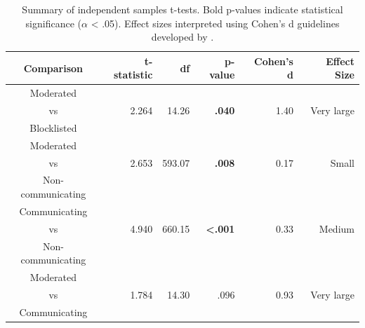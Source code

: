 \begin{table}[tb]
    \centering
    \begin{tabular}{@{}crrrrr@{}}
    \hline
    Comparison & t-statistic & df & p-value & Cohen's d & Effect Size \\
    \hline
    Moderated \\
    vs & 2.264 & 14.26 & \textbf{.040} & 1.40 & Very large \\
    Blocklisted \\
    \hline

    Moderated \\
    vs & 2.653 & 593.07 & \textbf{.008} & 0.17 & Small \\
    Non-communicating \\
    \hline

    Communicating \\
    vs & 4.940 & 660.15 & \textbf{<.001} & 0.33 & Medium \\
    Non-communicating \\
    \hline

    Moderated \\
    vs & 1.784 & 14.30 & .096 & 0.93 & Very large \\
    Communicating \\
    \hline
    \end{tabular}
    \caption{Summary of independent samples t-tests. Bold p-values indicate statistical significance ($\alpha$ < .05). Effect sizes interpreted using Cohen's d guidelines developed by \citet{funder:2019}.}
    \label{statistical-comparisons}
\end{table}
